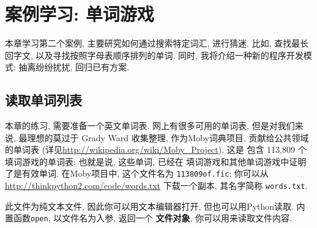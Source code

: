 \documentclass[10pt]{book}
\begin{document}
\chapter{案例学习: 单词游戏}
\label{wordplay}

本章学习第二个案例, 主要研究如何通过搜索特定词汇, 进行猜迷. 
比如, 查找最长回字文, 以及寻找按照字母表顺序排列的单词. 
同时, 我将介绍一种新的程序开发模式: 抽离纷纷扰扰, 回归已有方案. 


\section{读取单词列表}
\label{wordlist}
本章的练习, 需要准备一个英文单词表. 
网上有很多可用的单词表, 但是对我们来说, 最理想的莫过于
Grady Ward 收集整理, 作为Moby词典项目, 贡献给公共领域的单词表
(详见\url{http://wikipedia.org/wiki/Moby_Project}). 这是
包含 113,809 个填词游戏的单词表; 也就是说, 这些单词, 已经在
填词游戏和其他单词游戏中证明了是有效单词. 
在Moby项目中, 这个文件名为 {\tt 113809of.fic};
你可以从\url{http://thinkpython2.com/code/words.txt} 下载一个副本, 
其名字简称 {\tt words.txt}. 

此文件为纯文本文件, 因此你可以用文本编辑器打开, 
但也可以用Python读取. 
内置函数{\tt open}, 以文件名为入参, 返回一个 {\bf 文件对象}, 
你可以用来读取文件内容. 
\end{document}
